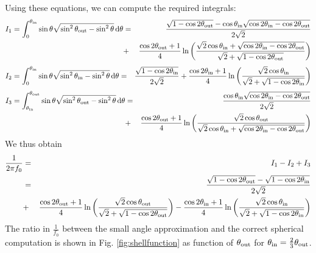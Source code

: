 \documentclass{article}[12pt,a4]
\begin{document}
Using these equations, we can compute the required integrals:
\begin{eqnarray}
I_1 = \int_0^{\theta_{\rm in}} \sin \theta \sqrt {\sin^2 \theta_{\rm out} - \sin^2 \theta} \, {\rm d}\theta & = &
\frac{\sqrt{1 - \cos 2\theta_{\rm out}} - 
               \cos \theta_{\rm in} \sqrt{\cos 2\theta_{\rm in} - \cos 2\theta_{\rm out}}}
              {2 \sqrt{2}} \nonumber \\
& + & \frac{\cos 2\theta_{\rm out}+1}{4} \ln 
\left( 
\frac{\sqrt{2} \cos \theta_{\rm in} + \sqrt{\cos 2\theta_{\rm in} - \cos 2\theta_{\rm out}}}
        {\sqrt{2} + \sqrt{1 - \cos 2\theta_{\rm out}}} 
\right)
\end{eqnarray}
\begin{eqnarray}
I_2 = \int_0^{\theta_{\rm in}} \sin \theta \sqrt {\sin^2 \theta_{\rm in} - \sin^2 \theta} \, {\rm d}\theta & = 
&\frac{\sqrt{1 - \cos 2\theta_{\rm in}}}{2 \sqrt{2}} + 
\frac{\cos 2\theta_{\rm in}+1}{4} \ln 
\left( 
\frac{\sqrt{2} \cos \theta_{\rm in}}{\sqrt{2} + \sqrt{1 - \cos 2\theta_{\rm in}}} 
\right)
\end{eqnarray}
\begin{eqnarray}
I_3 = \int_{\theta_{\rm in}}^{\theta_{\rm out}} \sin \theta \sqrt {\sin^2 \theta_{\rm out} - \sin^2 \theta} \, {\rm d}\theta & = &
\frac{\cos \theta_{\rm in} \sqrt{\cos 2\theta_{\rm in} - \cos 2\theta_{\rm out}}}{2 \sqrt{2}} \nonumber \\
& + &\frac{\cos 2\theta_{\rm out}+1}{4}
\ln \left( 
\frac{\sqrt{2} \cos \theta_{\rm out}}
{ \sqrt{2} \cos \theta_{\rm in} + \sqrt{\cos 2\theta_{\rm in} - \cos 2\theta_{\rm out}} }
\right)
\end{eqnarray}
We thus obtain
\begin{eqnarray}
\frac{1}{2\pi f_0} & = & I_1 - I_2 + I_3 \nonumber \\
& = & \frac{ \sqrt{1 - \cos 2\theta_{\rm out}} - \sqrt{1 - \cos 2\theta_{\rm in}} }{ 2 \sqrt{2} } \nonumber \\
& + & \frac{\cos 2\theta_{\rm out}+1}{4} \ln \left( 
\frac{\sqrt{2} \cos \theta_{\rm out}} {\sqrt{2} + \sqrt{1 - \cos 2\theta_{\rm out}}} \right) -
\frac{\cos 2\theta_{\rm in}+1}{4} \ln \left( 
\frac{\sqrt{2} \cos \theta_{\rm in}}{\sqrt{2} + \sqrt{1 - \cos 2\theta_{\rm in}}} \right)
\end{eqnarray}
The ratio in $\frac{1}{f_0}$ between the small angle approximation and the correct spherical
computation is shown in Fig. \ref{fig:shellfunction} as function of $\theta_{\rm out}$ for
$\theta_{\rm in} = \frac{2}{3}\theta_{\rm out}$.
\end{document}

